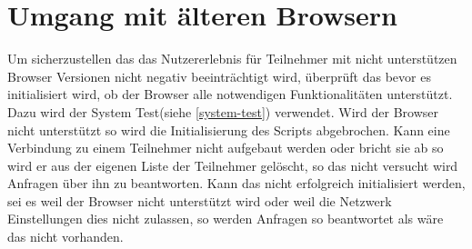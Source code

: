 \section{Umgang mit älteren Browsern}
Um sicherzustellen das das Nutzererlebnis für Teilnehmer mit nicht unterstützen Browser Versionen nicht negativ beeinträchtigt wird, überprüft das \cdn bevor es initialisiert wird, ob der Browser alle notwendigen Funktionalitäten unterstützt. Dazu wird der System Test(siehe \ref{system-test}) verwendet. Wird der Browser nicht unterstützt so wird die Initialisierung des Scripts abgebrochen. 
Kann eine Verbindung zu einem Teilnehmer nicht aufgebaut werden oder bricht sie ab so wird er aus der eigenen Liste der Teilnehmer gelöscht, so das nicht versucht wird Anfragen über ihn zu beantworten. 
Kann das \cdn nicht erfolgreich initialisiert werden, sei es weil der Browser nicht unterstützt wird oder weil die Netzwerk Einstellungen dies nicht zulassen, so werden Anfragen so beantwortet als wäre das \cdn nicht vorhanden.

